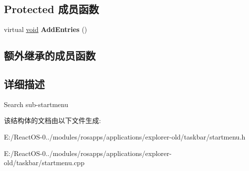 \subsection*{Protected 成员函数}
\begin{DoxyCompactItemize}
\item 
\mbox{\label{struct_search_menu_a8f3e4f2da3affaaf20b12b30dfb52c05}} 
virtual \hyperlink{interfacevoid}{void} {\bfseries Add\+Entries} ()
\end{DoxyCompactItemize}
\subsection*{额外继承的成员函数}


\subsection{详细描述}
Search sub-\/startmenu 

该结构体的文档由以下文件生成\+:\begin{DoxyCompactItemize}
\item 
E\+:/\+React\+O\+S-\/0../modules/rosapps/applications/explorer-\/old/taskbar/startmenu.\+h\item 
E\+:/\+React\+O\+S-\/0../modules/rosapps/applications/explorer-\/old/taskbar/startmenu.\+cpp\end{DoxyCompactItemize}
